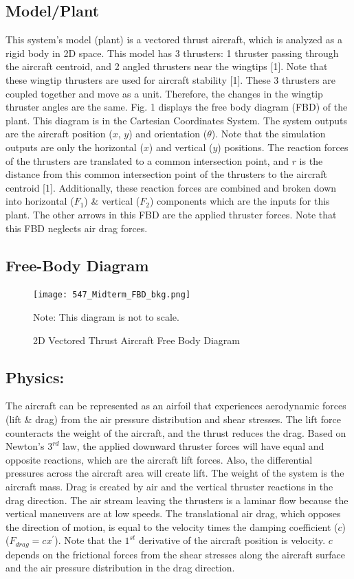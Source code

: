 \documentclass[conference]{IEEEtran}
\begin{document}
\subsection{Model/Plant}
This system's model (plant) is a vectored thrust aircraft, which is analyzed as a rigid body in 2D space. This model has 3 thrusters: 1 thruster passing through the aircraft centroid, and 2 angled thrusters near the wingtips [1]. Note that these wingtip thrusters are used for aircraft stability [1]. These 3 thrusters are coupled together and move as a unit. Therefore, the changes in the wingtip thruster angles are the same. Fig. 1 displays the free body diagram  (FBD) of the plant.  This diagram is in the Cartesian Coordinates System. The system outputs are the aircraft position ($x$, $y$) and orientation ($\theta$). Note that the simulation outputs are only the horizontal ($x$) and vertical ($y$) positions. The reaction forces of the thrusters are translated to a common intersection point, and $r$ is the distance from this common intersection point of the thrusters to the aircraft centroid [1]. Additionally, these reaction forces are combined and broken down into horizontal ($F_1$) \& vertical ($F_2$) components which are the inputs for this plant. The other arrows in this FBD are the applied thruster forces. Note that this FBD neglects air drag forces.

\subsection{Free-Body Diagram}
\begin{figure}[!htbp]
\centerline{\texttt{[image: 547\_Midterm\_FBD\_bkg.png]}}
\caption{2D Vectored Thrust Aircraft Free Body Diagram}
Note: This diagram is not to scale.
\label{figure1}
\end{figure}

\subsection{Physics:}
The aircraft can be represented as an airfoil that experiences aerodynamic forces (lift \& drag) from the air pressure distribution and shear stresses. The lift force counteracts the weight of the aircraft, and the thrust reduces the drag. Based on Newton’s $3^{rd}$ law, the applied downward thruster forces will have equal and opposite reactions, which are the aircraft lift forces. Also, the differential pressures across the aircraft area will create lift. The weight of the system is the aircraft mass. Drag is created by air and the vertical thruster reactions in the drag direction. The air stream leaving the thrusters is a laminar flow because the vertical maneuvers are at low speeds. The translational air drag, which opposes the direction of motion, is equal to the velocity times the damping coefficient ($c$) 
 ($F_{drag} = cx^\prime$). Note that the $1^{st}$ derivative of the aircraft position is velocity. $c$ depends on the frictional forces from the shear stresses along the aircraft surface and the air pressure distribution in the drag direction.\\
\end{document}
